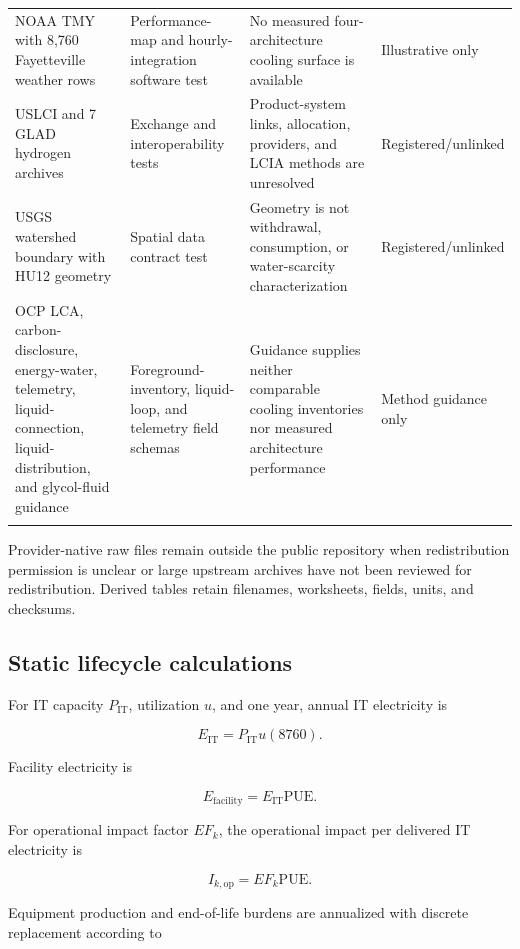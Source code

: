 \documentclass[review,12pt]{elsarticle}
\begin{document}
{\begin{longtable}{>{\raggedright\arraybackslash}p{}>{\raggedright\arraybackslash}p{}>{\raggedright\arraybackslash}p{}>{\raggedright\arraybackslash}p{}}
\addlinespace[2pt]
NOAA TMY with 8,760 Fayetteville weather rows \cite{ref45} & Performance-\allowbreak{}map and hourly-\allowbreak{}integration software test & No measured four-\allowbreak{}architecture cooling surface is available & Illustrative only \\
\addlinespace[2pt]
USLCI and 7 GLAD hydrogen archives \cite{ref46,ref47} & Exchange and interoperability tests & Product-\allowbreak{}system links, allocation, providers, and LCIA methods are unresolved & Registered/\allowbreak{}unlinked \\
\addlinespace[2pt]
USGS watershed boundary with HU12 geometry \cite{ref48} & Spatial data contract test & Geometry is not withdrawal, consumption, or water-\allowbreak{}scarcity characterization & Registered/\allowbreak{}unlinked \\
\addlinespace[2pt]
OCP LCA, carbon-\allowbreak{}disclosure, energy-\allowbreak{}water, telemetry, liquid-\allowbreak{}connection, liquid-\allowbreak{}distribution, and glycol-\allowbreak{}fluid guidance \cite{ref50,ref51,ref52,ref53,ref54,ref55,ref56} & Foreground-\allowbreak{}inventory, liquid-\allowbreak{}loop, and telemetry field schemas & Guidance supplies neither comparable cooling inventories nor measured architecture performance & Method guidance only \\
\addlinespace[2pt]
\end{longtable}
}

Provider-native raw files remain outside the public repository when redistribution permission is unclear or large upstream archives have not been reviewed for redistribution. Derived tables retain filenames, worksheets, fields, units, and checksums.

\subsection{Static lifecycle calculations}
For IT capacity $P_\mathrm{IT}$, utilization $u$, and one year, annual IT electricity is

\[
E_\mathrm{IT}=P_\mathrm{IT}u(8760).
\tag{1}
\]

Facility electricity is

\[
E_\mathrm{facility}=E_\mathrm{IT}\mathrm{PUE}.
\tag{2}
\]

For operational impact factor $EF_k$, the operational impact per delivered IT electricity is

\[
I_{k,\mathrm{op}}=EF_k\mathrm{PUE}.
\tag{3}
\]

Equipment production and end-of-life burdens are annualized with discrete replacement according to
\end{document}
